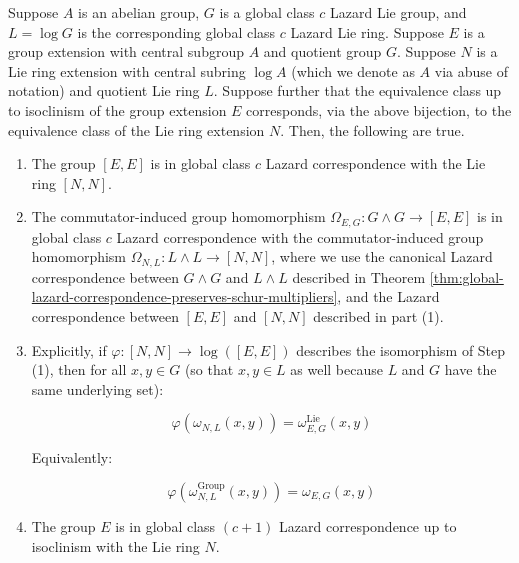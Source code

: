 





\begin{theorem}\label{thm:glcuti-extensions-implies-glcuti}
  Suppose $A$ is an abelian group, $G$ is a global class $c$ Lazard Lie
  group, and $L = \log G$ is the corresponding global class $c$ Lazard
  Lie ring. Suppose $E$ is a group extension with central subgroup $A$
  and quotient group $G$. Suppose $N$ is a Lie ring extension with
  central subring $\log A$ (which we denote as $A$ via abuse of
  notation) and quotient Lie ring $L$. Suppose further that the
  equivalence class up to isoclinism of the group extension $E$
  corresponds, via the above bijection, to the equivalence class of
  the Lie ring extension $N$. Then, the following are true.

  \begin{enumerate}
  \item The group $[E,E]$ is in global class $c$ Lazard correspondence
    with the Lie ring $[N,N]$.
  \item The commutator-induced group homomorphism $\Omega_{E,G}: G
    \wedge G \to [E,E]$ is in global class $c$ Lazard correspondence
    with the commutator-induced group homomorphism $\Omega_{N,L}: L
    \wedge L \to [N,N]$, where we use the canonical Lazard
    correspondence between $G \wedge G$ and $L \wedge L$ described in
    Theorem
    \ref{thm:global-lazard-correspondence-preserves-schur-multipliers},
    and the Lazard correspondence between $[E,E]$ and $[N,N]$
    described in part (1).
  \item Explicitly, if $\varphi:[N,N] \to \log([E,E])$ describes the
    isomorphism of Step (1), then for all $x,y \in G$ (so that $x,y
    \in L$ as well because $L$ and $G$ have the same underlying set):

    $$\varphi(\omega_{N,L}(x,y)) = \omega^{\text{Lie}}_{E,G}(x,y)$$

    Equivalently:

    $$\varphi(\omega^{\text{Group}}_{N,L}(x,y)) = \omega_{E,G}(x,y)$$

  \item The group $E$ is in global class $(c + 1)$ Lazard
    correspondence up to isoclinism with the Lie ring $N$.
  \end{enumerate}
\end{theorem}

